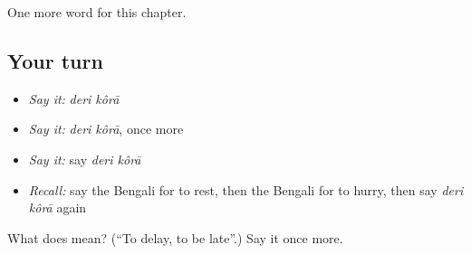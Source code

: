 \begin{grammarlens}[title={What you've built}]
One more word for this chapter.
\end{grammarlens}

\subsection*{Your turn}
\begin{itemize}
\raggedright
  \item \emph{Say it:} \emph{deri kôrā}
  \item \emph{Say it:} \emph{deri kôrā}, once more
  \item \emph{Say it:} say \emph{deri kôrā}
  \item \emph{Recall:} say the Bengali for to rest, then the Bengali for to hurry, then say \emph{deri kôrā} again
\end{itemize}

\begin{tcolorbox}[breakable,colback=teal!4,colframe=teal!35!black,title={Before you move on}]
What does   mean? (\textquotedblleft{}To delay, to be late\textquotedblright{}.) Say it once more.
\end{tcolorbox}
